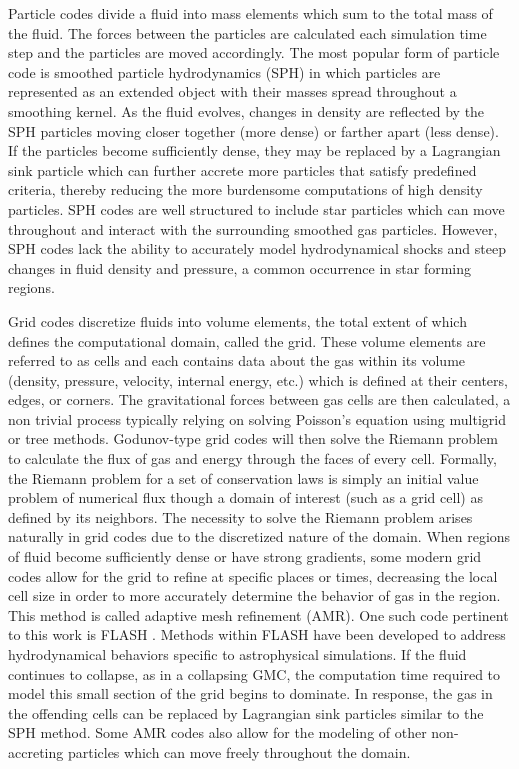 \documentclass[twoside]{drexel-thesis}
\begin{document}
\begin{thesis}
Particle codes divide a fluid into mass elements which sum to the total mass of the fluid. The forces between the particles are calculated each simulation time step and the particles are moved accordingly. The most popular form of particle code is smoothed particle hydrodynamics (SPH) in which particles are represented as an extended object with their masses spread throughout a smoothing kernel. As the fluid evolves, changes in density are reflected by the SPH particles moving closer together (more dense) or farther apart (less dense). If the particles become sufficiently dense, they may be replaced by a Lagrangian sink particle which can further accrete more particles that satisfy predefined criteria, thereby reducing the more burdensome computations of high density particles. SPH codes are well structured to include star particles which can move throughout and interact with the surrounding smoothed gas particles. However, SPH codes lack the ability to accurately model hydrodynamical shocks and steep changes in fluid density and pressure, a common occurrence in star forming regions. 

Grid codes discretize fluids into volume elements, the total extent of which defines the computational domain, called the grid. These volume elements are referred to as cells and each contains data about the gas within its volume (density, pressure, velocity, internal energy, etc.) which is defined at their centers, edges, or corners. The gravitational forces between gas cells are then calculated, a non trivial process typically relying on solving Poisson's equation using multigrid or tree methods. Godunov-type grid codes will then solve the Riemann problem to calculate the flux of gas and energy through the faces of every cell. Formally, the Riemann problem for a set of conservation laws is simply an initial value problem of numerical flux though a domain of interest (such as a grid cell) as defined by its neighbors. The necessity to solve the Riemann problem arises naturally in grid codes due to the discretized nature of the domain.  When regions of fluid become sufficiently dense or have strong gradients, some modern grid codes allow for the grid to refine at specific places or times, decreasing the local cell size in order to more accurately determine the behavior of gas in the region. This method is called adaptive mesh refinement (AMR). One such code pertinent to this work is FLASH \citep{fryxell_flash_2000}. Methods within FLASH have been developed to address hydrodynamical behaviors specific to astrophysical simulations. If the fluid continues to collapse, as in a collapsing GMC, the computation time required to model this small section of the grid begins to dominate. In response, the gas in the offending cells can be replaced by Lagrangian sink \citep{bate_modelling_1995,federrath_modeling_2010-1} particles similar to the SPH method. Some AMR codes also allow for the modeling of other non-accreting particles which can move freely throughout the domain.


\end{thesis}
\end{document}
